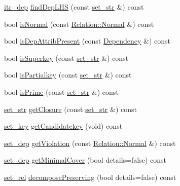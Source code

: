 \begin{DoxyCompactItemize}
\item 
\hyperlink{typedef_8h_ab78cecb3657d8a4377c1f9e4dba8778c}{itr\+\_\+dep} \hyperlink{class_relation_af67c3710d967393d2493c28aa6c84060}{find\+Dep\+L\+HS} (const \hyperlink{typedef_8h_aa234bdb39b1698c1d4955072cfb3195f}{set\+\_\+str} \&) const 
\item 
bool \hyperlink{class_relation_a5356ab1275c3f1dd82ab0a267d1dfabc}{is\+Normal} (const \hyperlink{class_relation_af4a36b464d672235cf91635f0816c95e}{Relation\+::\+Normal} \&) const 
\item 
bool \hyperlink{class_relation_ade40c2bc16bac827eaddca39b3b8964d}{is\+Dep\+Attrib\+Present} (const \hyperlink{class_dependency}{Dependency} \&) const 
\item 
bool \hyperlink{class_relation_a4c810ab6573fdd594a84e664bc21794a}{is\+Superkey} (const \hyperlink{typedef_8h_aa234bdb39b1698c1d4955072cfb3195f}{set\+\_\+str} \&) const 
\item 
bool \hyperlink{class_relation_a0d877107afd23e2e412011959de27740}{is\+Partialkey} (const \hyperlink{typedef_8h_aa234bdb39b1698c1d4955072cfb3195f}{set\+\_\+str} \&) const 
\item 
bool \hyperlink{class_relation_ae9ae78eb66d2950fea16dad1c21e62cd}{is\+Prime} (const \hyperlink{typedef_8h_aa234bdb39b1698c1d4955072cfb3195f}{set\+\_\+str} \&) const 
\item 
\hyperlink{typedef_8h_aa234bdb39b1698c1d4955072cfb3195f}{set\+\_\+str} \hyperlink{class_relation_a0cc1fd687a99bbe395b7a51b7080e91c}{get\+Closure} (const \hyperlink{typedef_8h_aa234bdb39b1698c1d4955072cfb3195f}{set\+\_\+str} \&) const 
\item 
\hyperlink{declaration_8h_a3205c77c822620c0f6dd4d42ccd70171}{set\+\_\+key} \hyperlink{class_relation_ad59a21ce2b07154ba6f14ce19e94bf9e}{get\+Candidatekey} (void) const 
\item 
\hyperlink{typedef_8h_a49fdcf14d2faf54629fca98482b2dfb9}{set\+\_\+dep} \hyperlink{class_relation_ad3db61785cf2aa64c5ac7451bdc1a1aa}{get\+Violation} (const \hyperlink{class_relation_af4a36b464d672235cf91635f0816c95e}{Relation\+::\+Normal} \&) const 
\item 
\hyperlink{typedef_8h_a49fdcf14d2faf54629fca98482b2dfb9}{set\+\_\+dep} \hyperlink{class_relation_a5373e82dc8498648a6c75aa85f895bf4}{get\+Minimal\+Cover} (bool details=false) const 
\item 
\hyperlink{typedef_8h_ae4f64e726e10cd561d68b42cf3a43e94}{set\+\_\+rel} \hyperlink{class_relation_a37f89ba2927b02631761e541fde9ff91}{decompose\+Preserving} (bool details=false) const 

\end{DoxyCompactItemize}
